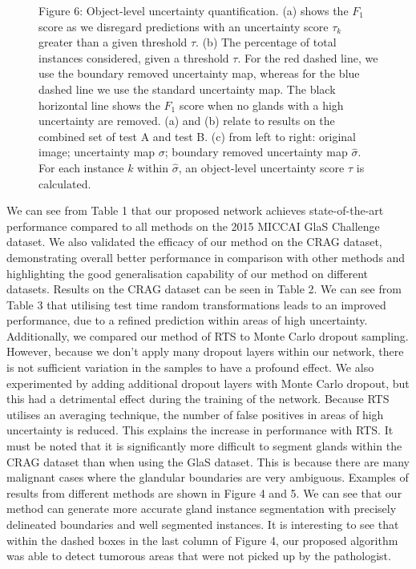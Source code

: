 \documentclass[3p]{elsarticle}
\begin{document}
\begin{figure}[!h]
\centering
\captionsetup[subfigure]{labelformat=empty}
\caption*{Figure 6: Object-level uncertainty quantification. (a) shows the $F_1$ score as we disregard predictions with an uncertainty score $\tau_k$ greater than a given threshold $\tau$. (b) The percentage of total instances considered, given a threshold $\tau$. For the red dashed line, we use the boundary removed uncertainty map, whereas for the blue dashed line we use the standard uncertainty map. The black horizontal line shows the $F_1$ score when no glands with a high uncertainty are removed. (a) and (b) relate to results on the combined set of test A and test B. (c) from left to right: original image; uncertainty map $\sigma$; boundary removed uncertainty map $\hat{\sigma}$. For each instance $k$ within $\hat{\sigma}$, an object-level uncertainty score $\tau$ is calculated. }
\end{figure}

We can see from Table 1 that our proposed network achieves state-of-the-art performance compared to all methods on the 2015 MICCAI GlaS Challenge dataset.
We also validated the efficacy of our method on the CRAG dataset, demonstrating overall better performance in comparison with other methods and highlighting the good generalisation capability of our method on different datasets. Results on the CRAG dataset can be seen in Table 2. We can see from Table 3 that utilising test time random transformations leads to an improved performance, due to a refined prediction within areas of high uncertainty. Additionally, we compared our method of RTS to Monte Carlo dropout sampling. However, because we don't apply many dropout layers within our network, there is not sufficient variation in the samples to have a profound effect. We also experimented by adding additional dropout layers with Monte Carlo dropout, but this had a detrimental effect during the training of the network. Because RTS utilises an averaging technique, the number of false positives in areas of high uncertainty is reduced. This explains the increase in performance with RTS. It must be noted that it is significantly more difficult to segment glands within the CRAG dataset than when using the GlaS dataset. This is because there are many malignant cases where the glandular boundaries are very ambiguous. Examples of results from different methods are shown in Figure 4 and 5. We can see that our method can generate more accurate gland instance segmentation with precisely delineated boundaries and well segmented instances. It is interesting to see that within the dashed boxes in the last column of Figure 4, our proposed algorithm was able to detect tumorous areas that were not picked up by the pathologist. 
\end{document}
